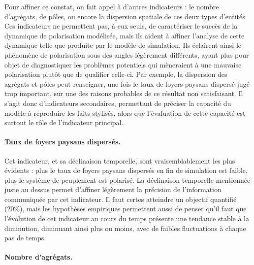 Pour affiner ce constat, on fait appel à d'autres indicateurs :
le nombre d'agrégats, de pôles, ou encore la dispersion spatiale de ces deux types d'entités.
Ces indicateurs ne permettent pas, à eux seuls, de caractériser le succès de la dynamique de polarisation modélisée, mais ils aident à affiner l'analyse de cette dynamique telle que produite par le modèle de simulation.
Ils éclairent ainsi le phénomène de polarisation sous des angles légèrement différents, ayant plus pour objet de diagnostiquer les problèmes potentiels qui mèneraient à une mauvaise polarisation plutôt que de qualifier celle-ci.
Par exemple, la dispersion des agrégats et pôles peut renseigner, une fois le taux de foyers paysans dispersé jugé trop important, sur une des raisons probables de ce résultat non satisfaisant.
Il s'agit donc d'indicateurs secondaires, permettant de préciser la capacité du modèle à reproduire les faits stylisés, alors que l'évaluation de cette capacité est surtout le rôle de l'indicateur principal.


\paragraph{Taux de foyers paysans dispersés.}

Cet indicateur, et sa déclinaison temporelle, sont vraisemblablement les plus évidents :
plus le taux de foyers paysans dispersés en fin de simulation est faible, plus le système de peuplement est polarisé.
La \og déclinaison temporelle\fg{} mentionnée juste au dessus permet d'affiner légèrement la précision de l'information communiquée par cet indicateur.
Il faut certes atteindre un objectif quantifié (20\%), mais les hypothèses empiriques permettent aussi de penser qu'il faut que l'évolution de cet indicateur au cours du temps présente une tendance stable à la diminution, diminuant ainsi plus ou moins, avec de faibles fluctuations à chaque pas de temps.

\paragraph{Nombre d'agrégats.}

